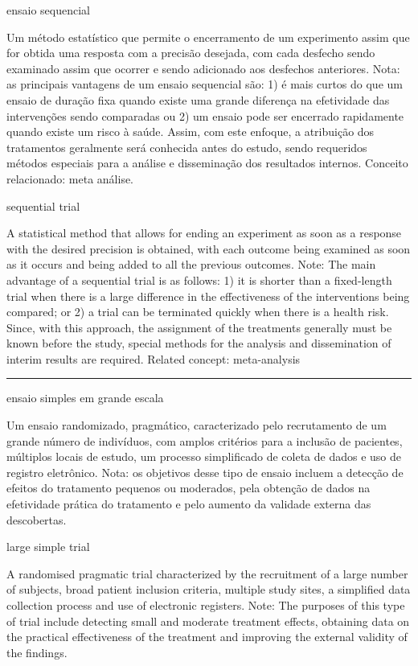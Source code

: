 \documentclass[
  openany]{book}
\begin{document}
ensaio sequencial

Um método estatístico que permite o encerramento de um experimento assim que for obtida uma resposta com a precisão desejada, com cada desfecho sendo examinado assim que ocorrer e sendo adicionado aos desfechos anteriores. Nota: as principais vantagens de um ensaio sequencial são: 1) é mais curtos do que um ensaio de duração fixa quando existe uma grande diferença na efetividade das intervenções sendo comparadas ou 2) um ensaio pode ser encerrado rapidamente quando existe um risco à saúde. Assim, com este enfoque, a atribuição dos tratamentos geralmente será conhecida antes do estudo, sendo requeridos métodos especiais para a análise e disseminação dos resultados internos. Conceito relacionado: meta análise.

sequential trial

A statistical method that allows for ending an experiment as soon as a response with the desired precision is obtained, with each outcome being examined as soon as it occurs and being added to all the previous outcomes. Note: The main advantage of a sequential trial is as follows: 1) it is shorter than a fixed-length trial when there is a large difference in the effectiveness of the interventions being compared; or 2) a trial can be terminated quickly when there is a health risk. Since, with this approach, the assignment of the treatments generally must be known before the study, special methods for the analysis and dissemination of interim results are required. Related concept: meta-analysis

\begin{center}\rule{0.5\linewidth}{0.5pt}\end{center}

ensaio simples em grande escala

Um ensaio randomizado, pragmático, caracterizado pelo recrutamento de um grande número de indivíduos, com amplos critérios para a inclusão de pacientes, múltiplos locais de estudo, um processo simplificado de coleta de dados e uso de registro eletrônico. Nota: os objetivos desse tipo de ensaio incluem a detecção de efeitos do tratamento pequenos ou moderados, pela obtenção de dados na efetividade prática do tratamento e pelo aumento da validade externa das descobertas.

large simple trial

A randomised pragmatic trial characterized by the recruitment of a large number of subjects, broad patient inclusion criteria, multiple study sites, a simplified data collection process and use of electronic registers. Note: The purposes of this type of trial include detecting small and moderate treatment effects, obtaining data on the practical effectiveness of the treatment and improving the external validity of the findings.
\end{document}
